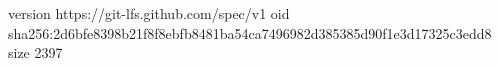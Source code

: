 version https://git-lfs.github.com/spec/v1
oid sha256:2d6bfe8398b21f8f8ebfb8481ba54ca7496982d385385d90f1e3d17325c3edd8
size 2397
